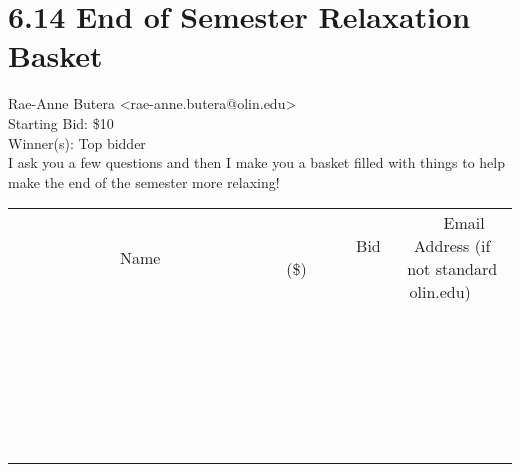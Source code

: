 \documentclass[11pt]{article}
\begin{document}
					\section*{6.14 End of Semester Relaxation Basket}
					Rae-Anne Butera <rae-anne.butera@olin.edu> \\
					Starting Bid: \$10 \\
					Winner(s): Top bidder \\
					I ask you a few questions and then I make you a basket filled with things to help make the end of the semester more relaxing! \\
					[6ex]
					\begin{tabular}{c c c}
						~~~~~~~~~~~~~Name~~~~~~~~~~~~~ & ~~~~~~~~~Bid (\$)~~~~~~~~~ & ~~~Email Address (if not standard olin.edu)~~~ \\
				
 & & \\
\hline
 & & \\
\hline
 & & \\
\hline
 & & \\
\hline
 & & \\
\hline
 & & \\
\hline
 & & \\
\hline
 & & \\
\hline
 & & \\
\hline
 & & \\
\hline
 & & \\
\hline
 & & \\
\hline
 & & \\
\hline
 & & \\
\hline
 & & \\
\hline
 & & \\
\hline
 & & \\
\hline
 & & \\
\hline
 & & \\
\hline
 & & \\
\hline
 & & \\
\hline
 & & \\
\hline
 & & \\
\hline
 & & \\
\hline
 & & \\
\hline
 & & \\
\hline
					\end{tabular}
					\clearpage
				
\end{document}
